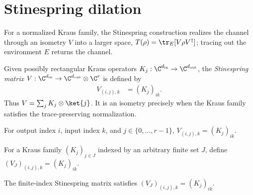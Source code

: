 \section{Stinespring dilation}
\label{sec:stinespring}

For a normalized Kraus family, the Stinespring construction realizes the
channel through an isometry $V$ into a larger space,
$T(\rho)=\tr_E[V\rho V^\dagger]$; tracing out the environment $E$ returns the
channel.

\begin{definition}\label{def:stinespring_v}
    \leanok
    Given possibly rectangular Kraus operators
    $K_j:\C^{d_{\mathrm{in}}}\to\C^{d_{\mathrm{out}}}$, the
    \emph{Stinespring matrix}
    $V:\C^{d_{\mathrm{in}}}\to
       \C^{d_{\mathrm{out}}}\otimes\C^r$ is defined by
    \begin{align}
        V_{(i,j),k}
        &=(K_j)_{ik}.
        \label{eq:representations_stinespring_entries}
    \end{align}
    Thus $V=\sum_j K_j\otimes\ket{j}$. It is an isometry precisely when
    the Kraus family satisfies the trace-preserving normalization.
\end{definition}

\begin{lemma}\label{lem:stinespring_v_apply}
    \leanok
    For output index $i$, input index $k$, and $j\in\{0,\ldots,r-1\}$,
    $V_{(i,j),k}=(K_j)_{ik}$.
\end{lemma}

\begin{definition}
    \label{def:stinespring_v_gen}
    \leanok
    For a Kraus family $(K_j)_{j\in J}$ indexed by an arbitrary finite set
    $J$, define $(V_J)_{(i,j),k}=(K_j)_{ik}$.
\end{definition}

\begin{lemma}
    \label{lem:stinespring_v_gen_apply}
    \leanok
    The finite-index Stinespring matrix satisfies
    $(V_J)_{(i,j),k}=(K_j)_{ik}$.
\end{lemma}

